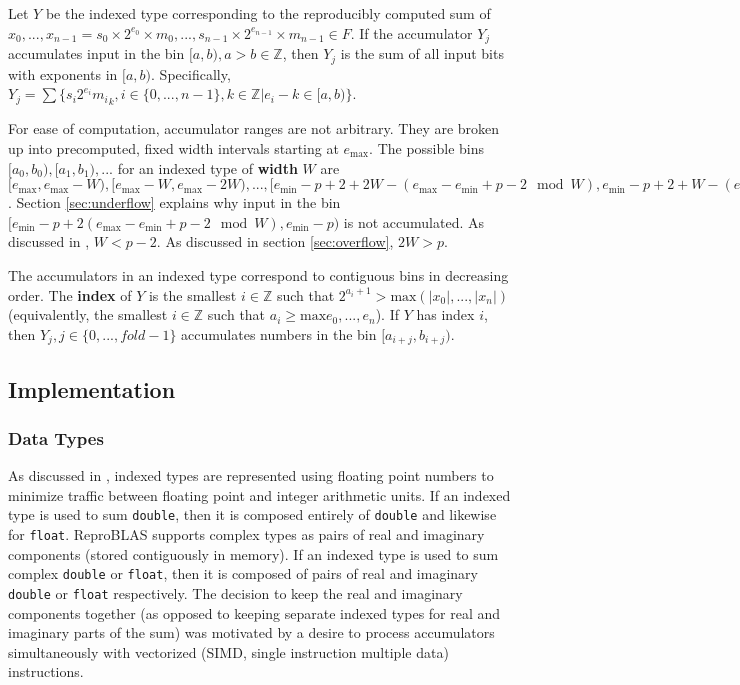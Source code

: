 \documentclass[12pt]{article}
\providecommand{\Z}{\ensuremath{\mathbb{Z}}}
\providecommand{\min}{\ensuremath{\text{min}}}
\providecommand{\max}{\ensuremath{\text{max}}}
\theoremstyle{plain}
\begin{document}
    Let $Y$ be the indexed type corresponding to the reproducibly computed sum of $x_0, ..., x_{n - 1} = s_0 \times 2^{e_0} \times m_0, ..., s_{n - 1} \times 2^{e_{n - 1}} \times m_{n - 1} \in F$.
    If the accumulator $Y_j$ accumulates input in the bin $[a, b), a > b \in \Z$, then $Y_j$ is the sum of all input bits with exponents in $[a, b)$. Specifically, $Y_j = \sum \{s_i2^{e_i}{m_i}_k, i \in \{0, ..., n - 1\}, k \in \Z | e_i - k \in [a, b)\}$.

    For ease of computation, accumulator ranges are not arbitrary. They are broken up into precomputed, fixed width intervals starting at $e_{\max}$. The possible bins $[a_0, b_0), [a_1, b_1), ...$ for an indexed type of \textbf{width} $W$ are $[e_{\max}, e_{\max} - W), [e_{\max} - W, e_{\max} - 2W), ..., [e_{\min} - p + 2 + 2W - (e_{\max} - e_{\min} + p - 2 \mod W), e_{\min} - p + 2 + W - (e_{\max} - e_{\min} + p - 2 \mod W))$. Section \ref{sec:underflow} explains why input in the bin $[e_{\min} - p + 2 (e_{\max} - e_{\min} + p - 2 \mod W), e_{\min} - p)$ is not accumulated. As discussed in \cite{repsum}, $W < p - 2$. As discussed in section \ref{sec:overflow}, $2W > p$.

    The accumulators in an indexed type correspond to contiguous bins in decreasing order. The \textbf{index} of $Y$ is the smallest $i \in \Z$ such that $2^{a_i + 1} > \max(|x_0|, ..., |x_n|)$ (equivalently, the smallest $i \in \Z$ such that $a_i \geq \max{e_0, ..., e_n}$). If $Y$ has index $i$, then $Y_j, j \in \{0, ..., fold - 1\}$ accumulates numbers in the bin $[a_{i + j}, b_{i + j})$.
  \subsection{Implementation}
    \subsubsection{Data Types}
      As discussed in \cite{repsum}, indexed types are represented using floating point numbers to minimize traffic between floating point and integer arithmetic units. If an indexed type is used to sum \verb|double|, then it is composed entirely of \verb|double| and likewise for \verb|float|. ReproBLAS supports complex types as pairs of real and imaginary components (stored contiguously in memory). If an indexed type is used to sum complex \verb|double| or \verb|float|, then it is composed of pairs of real and imaginary \verb|double| or \verb|float| respectively. The decision to keep the real and imaginary components together (as opposed to keeping separate indexed types for real and imaginary parts of the sum) was motivated by a desire to process accumulators simultaneously with vectorized (SIMD, single instruction multiple data) instructions.
\end{document}
